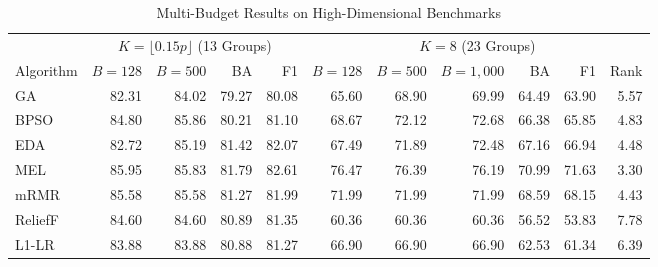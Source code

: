 \begin{table}[!t]
\centering
\begin{threeparttable}
\caption{Multi-Budget Results on High-Dimensional Benchmarks}
\label{tab:highdim_budgets}
\scriptsize
\setlength{\tabcolsep}{6.6pt}
\renewcommand{\arraystretch}{1.08}
\begin{tabular}{@{}lrrrr@{\hspace{18pt}}rrrrrr@{}}
\toprule
 & \multicolumn{4}{c}{$K = \lfloor 0.15p \rfloor$ (13 Groups)} & \multicolumn{6}{c}{$K = 8$ (23 Groups)} \\
\cmidrule(lr{18pt}){2-5} \cmidrule(l){6-11}
Algorithm & $B{=}128$ & $B{=}500$ & BA & F1 &
$B{=}128$ & $B{=}500$ & $B{=}1{,}000$ & BA & F1 & Rank \\
\midrule
GA      & 82.31\rlap{\textsuperscript{*}} & 84.02\rlap{\textsuperscript{*}} & 79.27 & 80.08\rlap{\textsuperscript{*}} & 65.60\rlap{\textsuperscript{*}} & 68.90\rlap{\textsuperscript{*}} & 69.99\rlap{\textsuperscript{*}} & 64.49\rlap{\textsuperscript{*}} & 63.90\rlap{\textsuperscript{*}} & 5.57 \\
BPSO    & 84.80 & 85.86 & 80.21 & 81.10 & 68.67\rlap{\textsuperscript{*}} & 72.12\rlap{\textsuperscript{*}} & 72.68\rlap{\textsuperscript{*}} & 66.38\rlap{\textsuperscript{*}} & 65.85\rlap{\textsuperscript{*}} & 4.83 \\
EDA     & 82.72 & 85.19 & 81.42 & 82.07\rlap{\textsuperscript{*}} & 67.49\rlap{\textsuperscript{*}} & 71.89\rlap{\textsuperscript{*}} & 72.48\rlap{\textsuperscript{*}} & 67.16\rlap{\textsuperscript{*}} & 66.94\rlap{\textsuperscript{*}} & 4.48 \\
MEL     & 85.95 & 85.83\rlap{\textsuperscript{*}} & 81.79 & 82.61\rlap{\textsuperscript{*}} & 76.47 & 76.39 & 76.19 & 70.99 & 71.63 & 3.30 \\
mRMR    & 85.58 & 85.58 & 81.27 & 81.99\rlap{\textsuperscript{*}} & 71.99\rlap{\textsuperscript{*}} & 71.99\rlap{\textsuperscript{*}} & 71.99\rlap{\textsuperscript{*}} & 68.59\rlap{\textsuperscript{*}} & 68.15\rlap{\textsuperscript{*}} & 4.43 \\
ReliefF & 84.60 & 84.60\rlap{\textsuperscript{*}} & 80.89 & 81.35\rlap{\textsuperscript{*}} & 60.36\rlap{\textsuperscript{*}} & 60.36\rlap{\textsuperscript{*}} & 60.36\rlap{\textsuperscript{*}} & 56.52\rlap{\textsuperscript{*}} & 53.83\rlap{\textsuperscript{*}} & 7.78 \\
L1-LR   & 83.88 & 83.88 & 80.88 & 81.27 & 66.90\rlap{\textsuperscript{*}} & 66.90\rlap{\textsuperscript{*}} & 66.90\rlap{\textsuperscript{*}} & 62.53\rlap{\textsuperscript{*}} & 61.34\rlap{\textsuperscript{*}} & 6.39 \\

\end{tabular}
\end{threeparttable}
\end{table}
